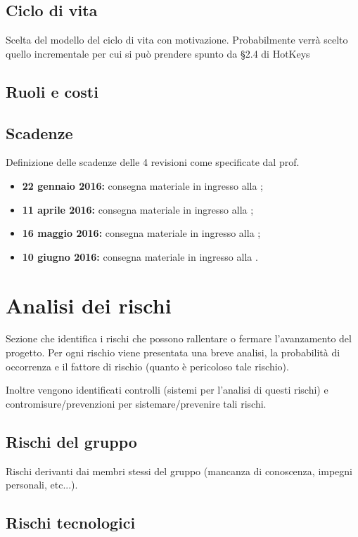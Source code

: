 \documentclass[12pt,a4paper]{article}
\begin{document}
\subsection{Ciclo di vita}
Scelta del modello del ciclo di vita con motivazione. Probabilmente verrà scelto quello incrementale per cui si può prendere spunto da §2.4 di HotKeys

\subsection{Ruoli e costi}

\subsection{Scadenze}
Definizione delle scadenze delle 4 revisioni come specificate dal prof.

\begin{itemize}
	\item \textbf{22 gennaio 2016:} consegna materiale in ingresso alla \RR;
	\item \textbf{11 aprile 2016:} consegna materiale in ingresso alla  \RP;
	\item \textbf{16 maggio 2016:} consegna materiale in ingresso alla \RQ;
	\item \textbf{10 giugno 2016:} consegna materiale in ingresso alla \RA.
\end{itemize}

\newpage

\section{Analisi dei rischi}
Sezione che identifica i rischi che possono rallentare o fermare l'avanzamento del progetto. Per ogni rischio viene presentata una breve analisi, la probabilità di occorrenza e il fattore di rischio (quanto è pericoloso tale rischio).

Inoltre vengono identificati controlli (sistemi per l'analisi di questi rischi) e contromisure/prevenzioni per sistemare/prevenire tali rischi.

\subsection{Rischi del gruppo}

Rischi derivanti dai membri stessi del gruppo (mancanza di conoscenza, impegni personali, etc...).

\subsection{Rischi tecnologici}
\end{document}
